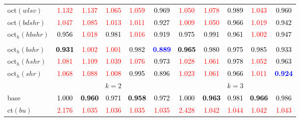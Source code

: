 \begin{tabular}[t]{l|>{}cccc>{}c|ccccc}
oct$(wlsv)$ & \textcolor{red}{1.132} & \textcolor{red}{1.137} & \textcolor{red}{1.065} & \textcolor{red}{1.059} & \textcolor{black}{0.969} & \textcolor{red}{1.050} & \textcolor{red}{1.078} & \textcolor{black}{0.989} & \textcolor{red}{1.043} & \textcolor{black}{0.960}\\
oct$(bdshr)$ & \textcolor{red}{1.047} & \textcolor{red}{1.085} & \textcolor{red}{1.013} & \textcolor{red}{1.011} & \textcolor{black}{0.927} & \textcolor{red}{1.009} & \textcolor{red}{1.050} & \textcolor{black}{0.966} & \textcolor{red}{1.019} & \textcolor{black}{0.942}\\
oct$_h(hbshr)$ & \textcolor{black}{0.956} & \textcolor{red}{1.018} & \textcolor{black}{0.981} & \textcolor{red}{1.016} & \textcolor{black}{0.919} & \textcolor{black}{0.975} & \textcolor{black}{0.991} & \textcolor{black}{0.961} & \textcolor{red}{1.002} & \textcolor{black}{0.947}\\[-1.5ex]
\hline\\[-1.5ex]
oct$_h(bshr)$ & \textcolor{black}{\textbf{0.931}} & \textcolor{red}{1.002} & \textcolor{red}{1.001} & \textcolor{black}{0.982} & \textcolor{blue}{\textbf{0.889}} & \textcolor{black}{\textbf{0.965}} & \textcolor{black}{0.980} & \textcolor{black}{0.975} & \textcolor{black}{0.985} & \textcolor{black}{0.933}\\
oct$_h(hshr)$ & \textcolor{red}{1.081} & \textcolor{red}{1.109} & \textcolor{red}{1.039} & \textcolor{red}{1.076} & \textcolor{black}{0.973} & \textcolor{red}{1.028} & \textcolor{red}{1.061} & \textcolor{black}{0.978} & \textcolor{red}{1.052} & \textcolor{black}{0.963}\\
oct$_h(shr)$ & \textcolor{red}{1.068} & \textcolor{red}{1.088} & \textcolor{red}{1.008} & \textcolor{black}{0.995} & \textcolor{black}{0.896} & \textcolor{red}{1.023} & \textcolor{red}{1.061} & \textcolor{black}{0.966} & \textcolor{red}{1.011} & \textcolor{blue}{\textbf{0.924}}\\
\addlinespace[0.3em]
\multicolumn{1}{c}{} & \multicolumn{5}{c}{\textbf{$k = 2$}} & \multicolumn{5}{c}{\textbf{$k = 3$}}\\
base & \textcolor{black}{1.000} & \textcolor{black}{\textbf{0.960}} & \textcolor{black}{0.971} & \textcolor{black}{\textbf{0.958}} & \textcolor{black}{0.972} & \textcolor{black}{1.000} & \textcolor{black}{\textbf{0.963}} & \textcolor{black}{0.981} & \textcolor{black}{\textbf{0.966}} & \textcolor{black}{0.986}\\
ct$(bu)$ & \textcolor{red}{2.176} & \textcolor{red}{1.035} & \textcolor{red}{1.036} & \textcolor{red}{1.035} & \textcolor{red}{1.035} & \textcolor{red}{2.428} & \textcolor{red}{1.042} & \textcolor{red}{1.044} & \textcolor{red}{1.042} & \textcolor{red}{1.043}\\

\end{tabular}
